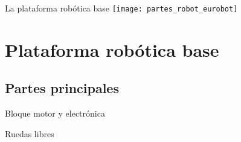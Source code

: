 \documentclass{beamer}
\begin{document}
\begin{frame}{La plataforma robótica base}
\centering
\texttt{[image: partes\_robot\_eurobot]}
\end{frame}




\section{Plataforma robótica base}
\subsection{Partes principales}

\begin{frame}{Bloque motor y electrónica}
\begin{center}
\end{center}
\end{frame}

\begin{frame}{Ruedas libres}
\begin{center}
\end{center}
\end{frame}
\end{document}
